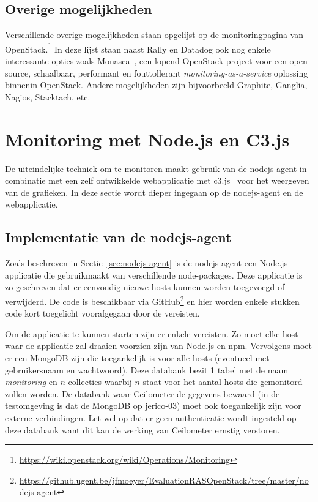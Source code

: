 \subsection{Overige mogelijkheden}

Verschillende overige mogelijkheden staan opgelijst op de monitoringpagina van OpenStack.\footnote{\url{https://wiki.openstack.org/wiki/Operations/Monitoring}} In deze lijst staan naast Rally en Datadog ook nog enkele interessante opties zoals Monasca~\cite{Openstack2017e}, een lopend OpenStack-project voor een open-source, schaalbaar, performant en fouttollerant \textit{monitoring-as-a-service} oplossing binnenin OpenStack. Andere mogelijkheden zijn bijvoorbeeld Graphite, Ganglia, Nagios, Stacktach, etc.

\section{Monitoring met Node.js en C3.js}
\label{sec:monitor_tool}

De uiteindelijke techniek om te monitoren maakt gebruik van de nodejs-agent in combinatie met een zelf ontwikkelde webapplicatie met c3.js~\cite{Tanaka2014} voor het weergeven van de grafieken. In deze sectie wordt dieper ingegaan op de nodejs-agent en de webapplicatie.

\subsection{Implementatie van de nodejs-agent}

Zoals beschreven in Sectie~\ref{sec:nodejs-agent} is de nodejs-agent een Node.js-applicatie die gebruikmaakt van verschillende node-packages. Deze applicatie is zo geschreven dat er eenvoudig nieuwe hosts kunnen worden toegevoegd of verwijderd. De code is beschikbaar via GitHub\footnote{\url{https://github.ugent.be/jfmoeyer/EvaluationRASOpenStack/tree/master/nodejs-agent}} en hier worden enkele stukken code kort toegelicht voorafgegaan door de vereisten.

Om de applicatie te kunnen starten zijn er enkele vereisten. Zo moet elke host waar de applicatie zal draaien voorzien zijn van Node.js en npm. Vervolgens moet er een MongoDB zijn die toegankelijk is voor alle hosts (eventueel met gebruikersnaam en wachtwoord). Deze databank bezit 1 tabel met de naam \textit{monitoring} en $n$ collecties waarbij $n$ staat voor het aantal hosts die gemonitord zullen worden. De databank waar Ceilometer de gegevens bewaard (in de testomgeving is dat de MongoDB op jerico-03) moet ook toegankelijk zijn voor externe verbindingen. Let wel op dat er geen authenticatie wordt ingesteld op deze databank want dit kan de werking van Ceilometer ernstig verstoren.

